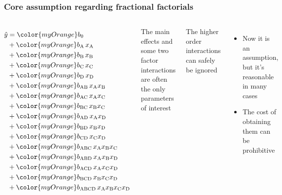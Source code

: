 \documentclass[handout,11pt,aspectratio=169,mathserif]{beamer}
\begin{document}
\begin{frame}\frametitle{Core assumption regarding fractional factorials}
	\begin{columns}
			{\scriptsize
			\begin{align*}
				\hat{y} &= {\color{myOrange}b_0}\\
						&+ {\color{myOrange}b_\text{A}\,}x_\text{A}\\
						&+ {\color{myOrange}b_\text{B}\,}x_\text{B}\\
						&+ {\color{myOrange}b_\text{C}\,}x_\text{C}\\
						&+ {\color{myOrange}b_\text{D}\,}x_\text{D}\\
						&+ {\color{myOrange}b_\text{AB}\,}x_\text{A}x_\text{B}\\
						&+ {\color{myOrange}b_\text{AC}\,}x_\text{A}x_\text{C}\\
						&+ {\color{myOrange}b_\text{BC}\,}x_\text{B}x_\text{C}\\
						&+ {\color{myOrange}b_\text{AD}\,}x_\text{A}x_\text{D}\\
						&+ {\color{myOrange}b_\text{BD}\,}x_\text{B}x_\text{D}\\
						&+ {\color{myOrange}b_\text{CD}\,}x_\text{C}x_\text{D}\\
						&+ {\color{myOrange}b_\text{ABC}\,}x_\text{A}x_\text{B}x_\text{C}\\
						&+ {\color{myOrange}b_\text{ABD}\,}x_\text{A}x_\text{B}x_\text{D}\\
						&+ {\color{myOrange}b_\text{ACD}\,}x_\text{A}x_\text{C}x_\text{D}\\
						&+ {\color{myOrange}b_\text{BCD}\,}x_\text{B}x_\text{C}x_\text{D}\\
						&+ {\color{myOrange}b_\text{ABCD}\,}x_\text{A}x_\text{B}x_\text{C}x_\text{D}
			\end{align*}
			}
			
			\pause
			The main effects and some two factor interactions are often the only parameters of interest
			
			\vspace{36pt}
			The higher order interactions can safely be ignored
			\begin{itemize}
				\item	Now it is an assumption, but it's reasonable in many cases
				\item	The cost of obtaining them can be prohibitive
			\end{itemize}
			
	\end{columns}
\end{frame}
\end{document}
